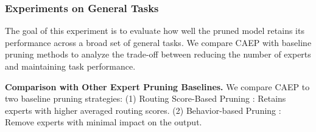 \documentclass[11pt]{article}
\begin{document}



\subsubsection{Experiments on General Tasks}
The goal of this experiment is to evaluate how well the pruned model retains its performance across a broad set of general tasks. We compare CAEP with baseline pruning methods to analyze the trade-off between reducing the number of experts and maintaining task performance.

\textbf{Comparison with Other Expert Pruning Baselines.}
We compare CAEP to two baseline pruning strategies: (1) Routing Score-Based Pruning \cite{muzio_seer-moe_2024}: Retains experts with higher averaged routing scores. (2) Behavior-based Pruning \cite{zhang_diversifying_2024}: Remove experts with minimal impact on the output. 

\end{document}

